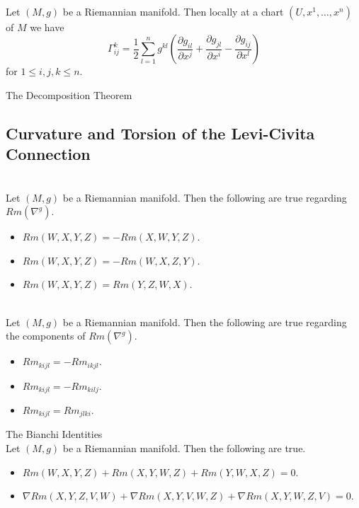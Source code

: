 \documentclass[a4paper]{article}
\begin{document}
\begin{prp}{}{}\\
Let $(M,g)$ be a Riemannian manifold. Then locally at a chart $(U,x^1,\dots,x^n)$ of $M$ we have $$\Gamma_{ij}^k=\frac{1}{2}\sum_{l=1}^ng^{kl}\left(\frac{\partial g_{il}}{\partial x^j}+\frac{\partial g_{jl}}{\partial x^i}-\frac{\partial g_{ij}}{\partial x^l}\right)$$ for $1\leq i,j,k\leq n$. 
\end{prp}

\begin{thm}{The Decomposition Theorem}{}
\end{thm}

\subsection{Curvature and Torsion of the Levi-Civita Connection}
\begin{prp}{}{}\\
Let $(M,g)$ be a Riemannian manifold. Then the following are true regarding $Rm(\nabla^g)$. 
\begin{itemize}
\item $Rm(W,X,Y,Z)=-Rm(X,W,Y,Z)$. 
\item $Rm(W,X,Y,Z)=-Rm(W,X,Z,Y)$. 
\item $Rm(W,X,Y,Z)=Rm(Y,Z,W,X)$. 
\end{itemize}
\end{prp}

\begin{crl}{}{}\\
Let $(M,g)$ be a Riemannian manifold. Then the following are true regarding the components of $Rm(\nabla^g)$. 
\begin{itemize}
\item $Rm_{kijl}=-Rm_{ikjl}$. 
\item $Rm_{kijl}=-Rm_{kilj}$. 
\item $Rm_{kijl}=Rm_{jlki}$. 
\end{itemize}
\end{crl}

\begin{prp}{The Bianchi Identities}{}\\
Let $(M,g)$ be a Riemannian manifold. Then the following are true. 
\begin{itemize}
\item $Rm(W,X,Y,Z)+Rm(X,Y,W,Z)+Rm(Y,W,X,Z)=0$. 
\item $\nabla Rm(X,Y,Z,V,W)+\nabla Rm(X,Y,V,W,Z)+\nabla Rm(X,Y,W,Z,V)=0$. 
\end{itemize}
\end{prp}
\end{document}
